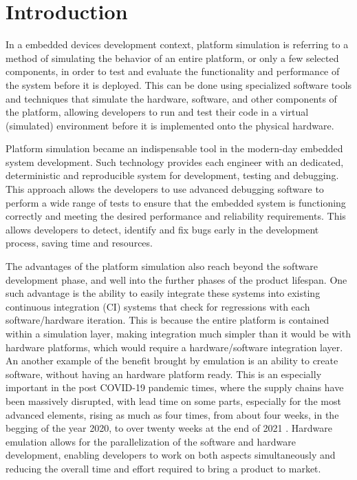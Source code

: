 
\chapter{Introduction}

In a embedded devices development context, platform simulation is referring to a method of simulating 
the behavior of an entire platform, or only a few selected components, in order to test and evaluate
the functionality and performance of the system before it is deployed. This can be done using specialized
software tools and techniques that simulate the hardware, software, and other components of the platform,
allowing developers to run and test their code in a virtual (simulated) environment before it is implemented
onto the physical hardware.

Platform simulation became an indispensable tool in the modern-day embedded system development. Such technology
provides each engineer with an dedicated, deterministic and reproducible system for development, testing and debugging.
This approach allows the developers to use advanced debugging software to perform a wide range of tests to ensure that
the embedded system is functioning correctly and meeting the desired performance and reliability requirements. 
This allows developers to detect, identify and fix bugs early in the development process, saving time and resources.

The advantages of the platform simulation also reach beyond the software development phase, and well into the further
phases of the product lifespan. One such advantage is the ability to easily integrate these systems into existing
continuous integration (CI) systems that check for regressions with each software/hardware iteration.
This is because the entire platform is contained within a simulation layer, making integration much simpler than it
would be with hardware platforms, which would require a hardware/software integration layer. An another example of
the benefit brought by emulation is an ability to create software, without having an hardware platform ready.
This is an especially important in the post COVID-19 pandemic times, where the supply chains have been massively
disrupted, with lead time on some parts, especially for the most advanced elements, rising as much as four times,
from about four weeks, in the begging of the year 2020, to over twenty weeks at the end of 2021
\cite{Covid19-AUTOMOTIVE} \cite{Covid19-LEAD-TIME} \cite{Covid19-LEAD-TIME-BLOOMBERG}. Hardware emulation allows for
the parallelization of the software and hardware development, enabling developers to work on both aspects
simultaneously and reducing the overall time and effort required to bring a product to market.

